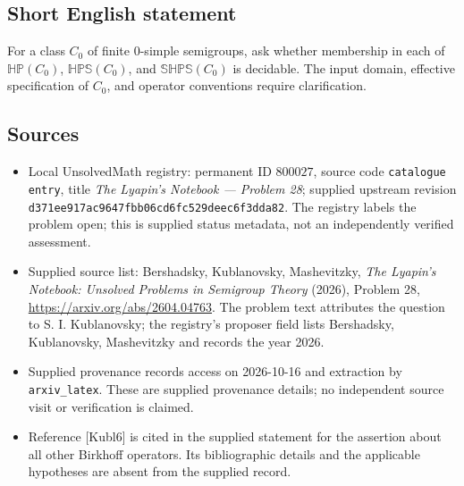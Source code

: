 \documentclass[11pt]{article}
\begin{document}
\subsection{Short English statement}
For a class \(C_0\) of finite \(0\)-simple semigroups, ask whether membership in each of \(\mathbb H\mathbb P(C_0)\), \(\mathbb H\mathbb P\mathbb S(C_0)\), and \(\mathbb S\mathbb H\mathbb P\mathbb S(C_0)\) is decidable. The input domain, effective specification of \(C_0\), and operator conventions require clarification.
\subsection{Sources}
\begin{itemize}
\item Local UnsolvedMath registry: permanent ID \(800027\), source code \texttt{catalogue entry}, title \emph{The Lyapin's Notebook --- Problem 28}; supplied upstream revision \texttt{d371ee917ac9647fbb06cd6fc529deec6f3dda82}. The registry labels the problem open; this is supplied status metadata, not an independently verified assessment.
\item Supplied source list: Bershadsky, Kublanovsky, Mashevitzky, \emph{The Lyapin's Notebook: Unsolved Problems in Semigroup Theory} (2026), Problem 28, \url{https://arxiv.org/abs/2604.04763}. The problem text attributes the question to S. I. Kublanovsky; the registry's proposer field lists Bershadsky, Kublanovsky, Mashevitzky and records the year 2026.
\item Supplied provenance records access on 2026-10-16 and extraction by \texttt{arxiv\_latex}. These are supplied provenance details; no independent source visit or verification is claimed.
\item Reference [Kubl6] is cited in the supplied statement for the assertion about all other Birkhoff operators. Its bibliographic details and the applicable hypotheses are absent from the supplied record.
\end{itemize}
\end{document}
